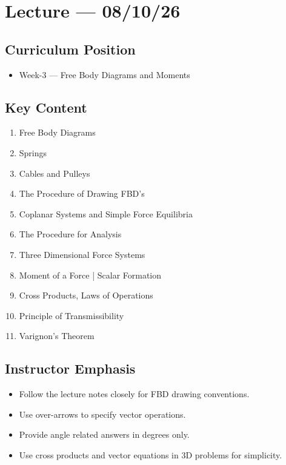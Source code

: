 \section{Lecture — 08/10/26}


\subsection*{Curriculum Position}
\begin{itemize}
    \item Week-3 — Free Body Diagrams and Moments
\end{itemize}

\subsection*{Key Content}
\begin{enumerate}
    \item Free Body Diagrams
    \item Springs
    \item Cables and Pulleys 
    \item The Procedure of Drawing FBD's
    \item Coplanar Systems and Simple Force Equilibria
    \item The Procedure for Analysis
    \item Three Dimensional Force Systems 
    \item Moment of a Force | Scalar Formation 
    \item Cross Products, Laws of Operations
    \item Principle of Transmissibility 
    \item Varignon's Theorem 
    
\end{enumerate}

\subsection*{Instructor Emphasis}
\begin{itemize}
    \item Follow the lecture notes closely for FBD drawing conventions. 
    \item Use over-arrows to specify vector operations.
    \item Provide angle related answers in degrees only. 
    \item Use cross products and vector equations in 3D problems for simplicity.
\end{itemize} 

